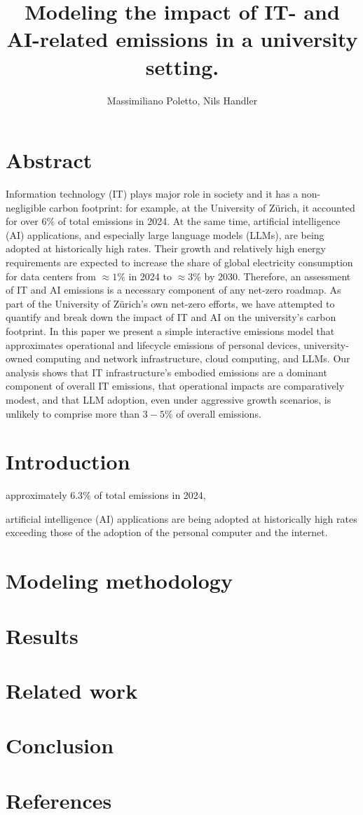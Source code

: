 \documentclass[11pt]{article}
\title{Modeling the impact of IT- and AI-related emissions in a university setting.}
\author{Massimiliano Poletto, Nils Handler}
\begin{document}
\maketitle

\section{Abstract}
Information technology (IT) plays major role in society and it has a non-negligible carbon footprint: for example, at the University of Zürich, it accounted for over $6\%$ of total emissions in 2024. At the same time, artificial intelligence (AI) applications, and especially large language models (LLMs), are being adopted at historically high rates. Their growth and relatively high energy requirements are expected to increase the share of global electricity consumption for data centers from $\approx 1\%$ in 2024 to $\approx 3\%$ by 2030. Therefore, an assessment of IT and AI emissions is a necessary component of any net-zero roadmap. As part of the University of Zürich's own net-zero efforts, we have attempted to quantify and break down the impact of IT and AI on the university's carbon footprint. In this paper we present a simple interactive emissions model that approximates operational and lifecycle emissions of personal devices, university-owned computing and network infrastructure, cloud computing, and LLMs. Our analysis shows that IT infrastructure's embodied emissions are a dominant component of overall IT emissions, that operational impacts are comparatively modest, and that LLM adoption, even under aggressive growth scenarios, is unlikely to comprise more than $3-5\%$ of overall emissions.

\section{Introduction}

approximately $6.3\%$ of total emissions in 2024\cite{uzh:sustainability:report},

artificial intelligence (AI) applications are being adopted at historically high rates exceeding those of the adoption of the personal computer and the internet\cite{bick:ai:adoption}.

\section{Modeling methodology}

\section{Results}

\section{Related work}

\section{Conclusion}

\section{References}

\printbibliography
\end{document}

